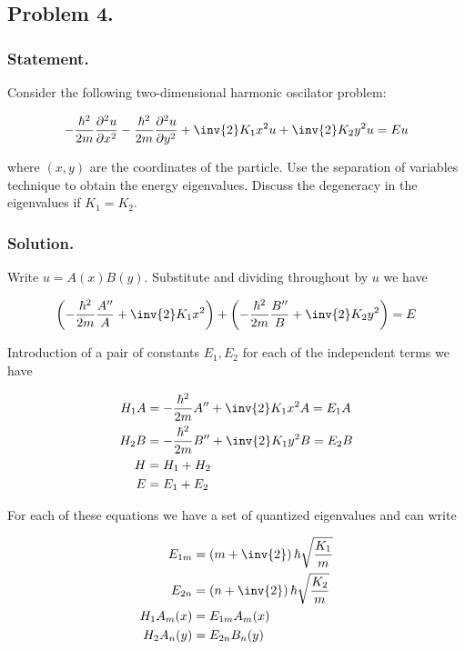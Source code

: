 \subsection{Problem 4.}
\subsubsection{Statement.}

Consider the following two-dimensional harmonic oscilator problem:

\begin{align}\label{eqn:desaiCh9:400}
-\frac{\hbar^2}{2m} \frac{\partial^2 u}{\partial x^2}
-\frac{\hbar^2}{2m} \frac{\partial^2 u}{\partial y^2}
+ \inv{2} K_1 x^2 u
+ \inv{2} K_2 y^2 u
= E u
\end{align}

where $(x,y)$ are the coordinates of the particle.  Use the separation of variables technique to obtain the energy eigenvalues.  Discuss the degeneracy in the eigenvalues if $K_1 = K_2$.

\subsubsection{Solution.}

Write $u = A(x) B(y)$.  Substitute and dividing throughout by $u$ we have

\begin{align}\label{eqn:desaiCh9:401}
\left( -\frac{\hbar^2}{2m} \frac{A''}{A} + \inv{2} K_1 x^2 \right)
+\left( -\frac{\hbar^2}{2m} \frac{B''}{B} + \inv{2} K_2 y^2 \right)
= E
\end{align}

Introduction of a pair of constants $E_1, E_2$ for each of the independent terms we have

\begin{align}\label{eqn:desaiCh9:403}
H_1 A &= -\frac{\hbar^2}{2m} A'' + \inv{2} K_1 x^2 A = E_1 A \\
H_2 B &= -\frac{\hbar^2}{2m} B'' + \inv{2} K_1 y^2 B = E_2 B \\
H &= H_1 + H_2 \\
E  &= E_1 + E_2
\end{align}

For each of these equations we have a set of quantized eigenvalues and can write

\begin{align}\label{eqn:desaiCh9:404}
E_{1m} &= \left(m + \inv{2}\right) \hbar \sqrt{\frac{K_1}{m}} \\
E_{2n} &= \left(n + \inv{2}\right) \hbar \sqrt{\frac{K_2}{m}} \\
H_1 A_m(x) &= E_{1m} A_m(x) \\
H_2 A_n(y) &= E_{2n} B_n(y)
\end{align}

